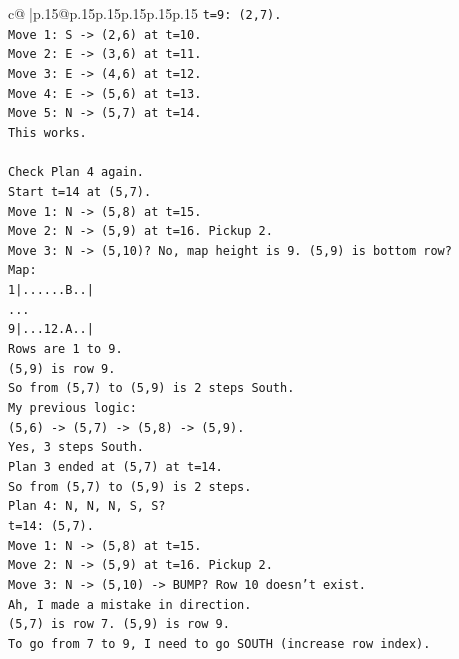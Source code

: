 \documentclass{article}
\begin{document}
{\begin{supertabular}{c@{$\;$}|p{.15\linewidth}@{}p{.15\linewidth}p{.15\linewidth}p{.15\linewidth}p{.15\linewidth}p{.15\linewidth}}
{{{\texttt{t=9: (2,7).} \\
\texttt{Move 1: S {-}> (2,6) at t=10.} \\
\texttt{Move 2: E {-}> (3,6) at t=11.} \\
\texttt{Move 3: E {-}> (4,6) at t=12.} \\
\texttt{Move 4: E {-}> (5,6) at t=13.} \\
\texttt{Move 5: N {-}> (5,7) at t=14.} \\
\texttt{This works.} \\
\\ 
\texttt{Check Plan 4 again.} \\
\texttt{Start t=14 at (5,7).} \\
\texttt{Move 1: N {-}> (5,8) at t=15.} \\
\texttt{Move 2: N {-}> (5,9) at t=16. Pickup 2.} \\
\texttt{Move 3: N {-}> (5,10)? No, map height is 9. (5,9) is bottom row?} \\
\texttt{Map:} \\
\texttt{1|......B..|} \\
\texttt{...} \\
\texttt{9|...12.A..|} \\
\texttt{Rows are 1 to 9.} \\
\texttt{(5,9) is row 9.} \\
\texttt{So from (5,7) to (5,9) is 2 steps South.} \\
\texttt{My previous logic:} \\
\texttt{(5,6) {-}> (5,7) {-}> (5,8) {-}> (5,9).} \\
\texttt{Yes, 3 steps South.} \\
\texttt{Plan 3 ended at (5,7) at t=14.} \\
\texttt{So from (5,7) to (5,9) is 2 steps.} \\
\texttt{Plan 4: N, N, N, S, S?} \\
\texttt{t=14: (5,7).} \\
\texttt{Move 1: N {-}> (5,8) at t=15.} \\
\texttt{Move 2: N {-}> (5,9) at t=16. Pickup 2.} \\
\texttt{Move 3: N {-}> (5,10) {-}> BUMP? Row 10 doesn't exist.} \\
\texttt{Ah, I made a mistake in direction.} \\
\texttt{(5,7) is row 7. (5,9) is row 9.} \\
\texttt{To go from 7 to 9, I need to go SOUTH (increase row index).} \\
}}}
\end{supertabular}}
\end{document}
